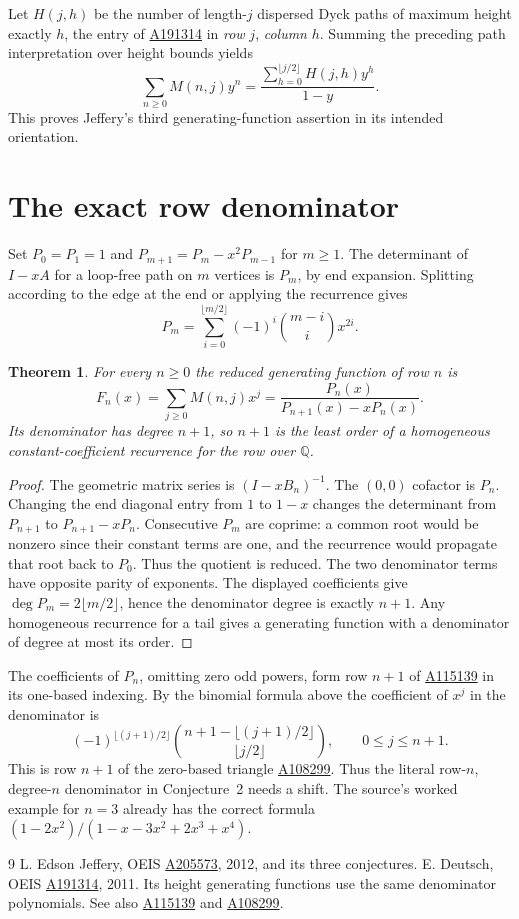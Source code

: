 \documentclass[11pt,letterpaper]{article}
\newtheorem{theorem}{Theorem}
\newcommand{\oeis}[1]{\href{https://oeis.org/A#1}{A#1}}
\begin{document}
Let $H(j,h)$ be the number of length-$j$ dispersed Dyck paths of maximum height exactly $h$, the entry of \oeis{191314} in \emph{row} $j$, \emph{column} $h$. Summing the preceding path interpretation over height bounds yields
\[
 \sum_{n\ge0}M(n,j)y^n
   =\frac{\sum_{h=0}^{\lfloor j/2\rfloor} H(j,h)y^h}{1-y}.
\]
This proves Jeffery's third generating-function assertion in its intended orientation.

\section{The exact row denominator}
Set $P_0=P_1=1$ and $P_{m+1}=P_m-x^2P_{m-1}$ for $m\ge1$. The determinant of $I-xA$ for a loop-free path on $m$ vertices is $P_m$, by end expansion. Splitting according to the edge at the end or applying the recurrence gives
\[
             P_m=\sum_{i=0}^{\lfloor m/2\rfloor}
                        (-1)^i\binom{m-i}{i}x^{2i}.
\]
\begin{theorem}
For every $n\ge0$ the reduced generating function of row $n$ is
\[
 F_n(x)=\sum_{j\ge0}M(n,j)x^j
       =\frac{P_n(x)}{P_{n+1}(x)-xP_n(x)}.
\]
Its denominator has degree $n+1$, so $n+1$ is the least order of a homogeneous constant-coefficient recurrence for the row over $\mathbb Q$.
\end{theorem}
\begin{proof}
The geometric matrix series is $(I-xB_n)^{-1}$. The $(0,0)$ cofactor is $P_n$. Changing the end diagonal entry from $1$ to $1-x$ changes the determinant from $P_{n+1}$ to $P_{n+1}-xP_n$. Consecutive $P_m$ are coprime: a common root would be nonzero since their constant terms are one, and the recurrence would propagate that root back to $P_0$. Thus the quotient is reduced. The two denominator terms have opposite parity of exponents. The displayed coefficients give $\deg P_m=2\lfloor m/2\rfloor$, hence the denominator degree is exactly $n+1$. Any homogeneous recurrence for a tail gives a generating function with a denominator of degree at most its order.
\end{proof}

The coefficients of $P_n$, omitting zero odd powers, form row $n+1$ of \oeis{115139} in its one-based indexing. By the binomial formula above the coefficient of $x^j$ in the denominator is
\[
 (-1)^{\lfloor(j+1)/2\rfloor}
 \binom{n+1-\lfloor(j+1)/2\rfloor}{\lfloor j/2\rfloor},
 \qquad 0\le j\le n+1 .
\]
This is row $n+1$ of the zero-based triangle \oeis{108299}. Thus the literal row-$n$, degree-$n$ denominator in Conjecture~2 needs a shift. The source's worked example for $n=3$ already has the correct formula
$(1-2x^2)/(1-x-3x^2+2x^3+x^4)$.

\begin{thebibliography}{9}
 L. Edson Jeffery, OEIS \oeis{205573}, 2012, and its three conjectures.
 E. Deutsch, OEIS \oeis{191314}, 2011. Its height generating functions use the same denominator polynomials. See also \oeis{115139} and \oeis{108299}.
\end{thebibliography}
\end{document}
